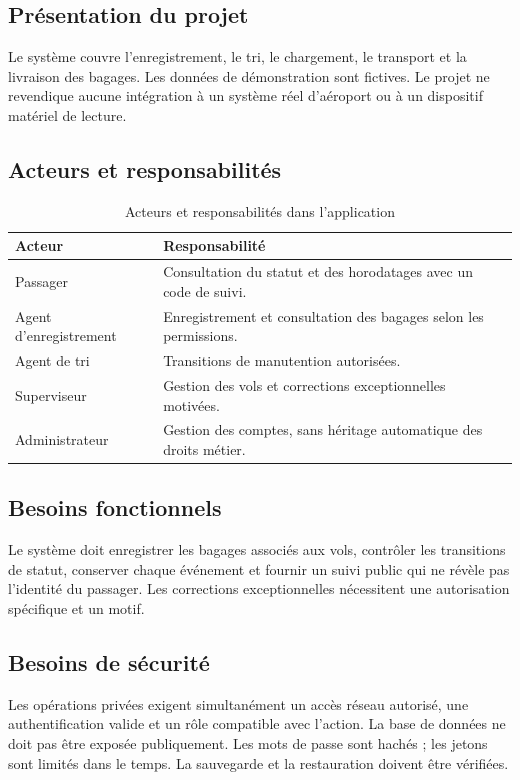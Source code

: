 \documentclass[11pt]{extarticle}
\begin{document}
\subsection{Présentation du projet}
Le système couvre l'enregistrement, le tri, le chargement, le transport et la livraison des bagages. Les données de démonstration sont fictives. Le projet ne revendique aucune intégration à un système réel d'aéroport ou à un dispositif matériel de lecture.
\subsection{Acteurs et responsabilités}
\begin{table}[htbp]\centering
\caption{Acteurs et responsabilités dans l'application}
\begin{tabular}{p{3.6cm}p{10cm}}\toprule
\textbf{Acteur} & \textbf{Responsabilité}\\\midrule
Passager & Consultation du statut et des horodatages avec un code de suivi.\\
Agent d'enregistrement & Enregistrement et consultation des bagages selon les permissions.\\
Agent de tri & Transitions de manutention autorisées.\\
Superviseur & Gestion des vols et corrections exceptionnelles motivées.\\
Administrateur & Gestion des comptes, sans héritage automatique des droits métier.\\\bottomrule
\end{tabular}\end{table}
\subsection{Besoins fonctionnels}
Le système doit enregistrer les bagages associés aux vols, contrôler les transitions de statut, conserver chaque événement et fournir un suivi public qui ne révèle pas l'identité du passager. Les corrections exceptionnelles nécessitent une autorisation spécifique et un motif.
\subsection{Besoins de sécurité}
Les opérations privées exigent simultanément un accès réseau autorisé, une authentification valide et un rôle compatible avec l'action. La base de données ne doit pas être exposée publiquement. Les mots de passe sont hachés ; les jetons sont limités dans le temps. La sauvegarde et la restauration doivent être vérifiées.
\end{document}
